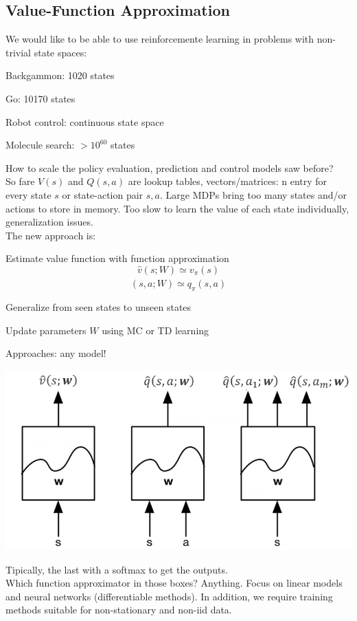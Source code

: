 \documentclass[10pt]{report}
\begin{document}
\subsection{Value-Function Approximation}
We would like to be able to use reinforcemente learning in problems with non-trivial state spaces:\begin{list}{}{}
	\item Backgammon: 1020 states
	\item Go: 10170 states
	\item Robot control: continuous state space
	\item Molecule search: $>10^{60}$ states
\end{list}
How to scale the policy evaluation, prediction and control models saw before?\\
So fare $V(s)$ and $Q(s,a)$ are lookup tables, vectors/matrices: n entry for every state $s$ or state-action pair $s,a$. Large MDPs bring too many states and/or actions to store in memory. Too slow to learn the value of each state individually, generalization issues.\\
The new approach is:
\begin{list}{}{}
	\item Estimate value function with function approximation 
	$$\hat{v}(s;W)\simeq v_\pi(s)$$
	$$\hat{(s,a;W)}\simeq q_\pi(s,a)$$
	\item Generalize from seen states to unseen states
	\item Update parameters $W$ using MC or TD learning
\end{list}
Approaches: any model!
\begin{center}
	\includegraphics[scale=0.5]{176.png}
\end{center}
Tipically, the last with a softmax to get the outputs.\\
Which function approximator in those boxes? Anything. Focus on linear models and neural networks (differentiable methods). In addition, we require training methods suitable for non-stationary and non-iid data.
\end{document}
